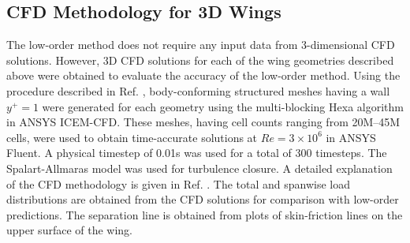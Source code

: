\subsection{CFD Methodology for 3D Wings}
\label{sec:cfd-meth}
The low-order method does not require any input data from 3-dimensional CFD solutions. However, 3D CFD solutions for each of the wing geometries described above were obtained to evaluate the accuracy of the low-order method. Using the procedure described in Ref. \cite{Jamwal2018}, body-conforming structured meshes having a wall $y^+ = 1$  were generated for each geometry using the multi-blocking Hexa algorithm in ANSYS ICEM-CFD. These meshes, having cell counts ranging from 20M--45M cells, were used to obtain time-accurate solutions at $Re = 3\times10^6$ in ANSYS Fluent. A physical timestep of 0.01s was used for a total of 300 timesteps. The Spalart-Allmaras model was used for turbulence closure.
A detailed explanation of the CFD methodology is given in Ref. \cite{AbhimanyuThesis}. The total and spanwise load distributions are obtained from the CFD solutions for comparison with low-order predictions. The separation line is obtained from plots of skin-friction lines on the upper surface of the wing.


\newcommand{\clmax}{\ensuremath{C_{l, \text{max}}}}
\newcommand{\CLmax}{\ensuremath{C_{L, \text{max}}}}




